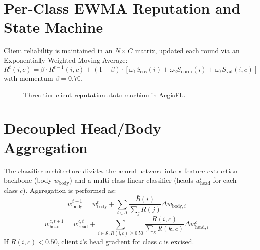 \documentclass[12pt,a4paper]{report}
\begin{document}
\section{Per-Class EWMA Reputation and State Machine}
Client reliability is maintained in an $N \times C$ matrix, updated each round via an Exponentially Weighted Moving Average:
\begin{equation}
R^{t}(i, c) = \beta \cdot R^{t-1}(i, c) + (1 - \beta) \cdot \left[ \omega_1 S_{\text{cos}}(i) + \omega_2 S_{\text{norm}}(i) + \omega_3 S_{\text{val}}(i, c) \right]
\end{equation}
with momentum $\beta = 0.70$.

\begin{figure}[H]
\centering
{}
\caption{Three-tier client reputation state machine in AegisFL.}
\label{fig:statemachine}
\end{figure}

\section{Decoupled Head/Body Aggregation}
The classifier architecture divides the neural network into a feature extraction backbone (body $w_{\text{body}}$) and a multi-class linear classifier (heads $w_{\text{head}}^c$ for each class $c$). Aggregation is performed as:
\begin{equation}
w_{\text{body}}^{t+1} = w_{\text{body}}^t + \sum_{i \in \mathcal{S}} \frac{\bar{R}(i)}{\sum_j \bar{R}(j)} \Delta w_{\text{body}, i}
\end{equation}
\begin{equation}
w_{\text{head}}^{c, t+1} = w_{\text{head}}^{c, t} + \sum_{i \in \mathcal{S}, R(i, c) \ge 0.50} \frac{R(i, c)}{\sum_k R(k, c)} \Delta w_{\text{head}, i}^c
\end{equation}
If $R(i, c) < 0.50$, client $i$'s head gradient for class $c$ is excised.
\end{document}
